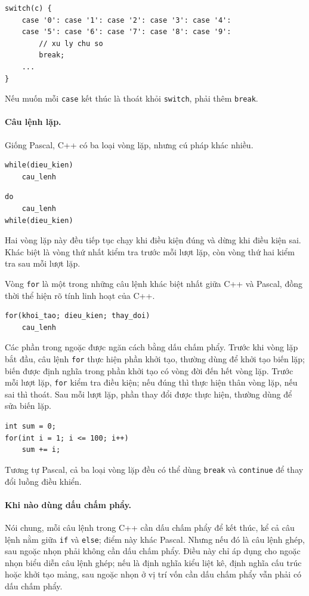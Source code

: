 \documentclass[11pt]{article}
\newcommand{\cpp}{C++}
\newcommand{\pascal}{Pascal}
\begin{document}
\begin{verbatim}
switch(c) {
    case '0': case '1': case '2': case '3': case '4':
    case '5': case '6': case '7': case '8': case '9':
        // xu ly chu so
        break;
    ...
}
\end{verbatim}

Nếu muốn mỗi \verb|case| kết thúc là thoát khỏi \verb|switch|, phải thêm
\verb|break|.

\paragraph{Câu lệnh lặp.}
Giống \pascal{}, \cpp{} có ba loại vòng lặp, nhưng cú pháp khác nhiều.

\begin{verbatim}
while(dieu_kien)
    cau_lenh
\end{verbatim}

\begin{verbatim}
do
    cau_lenh
while(dieu_kien)
\end{verbatim}

Hai vòng lặp này đều tiếp tục chạy khi điều kiện đúng và dừng khi điều kiện
sai. Khác biệt là vòng thứ nhất kiểm tra trước mỗi lượt lặp, còn vòng thứ hai
kiểm tra sau mỗi lượt lặp.

Vòng \verb|for| là một trong những câu lệnh khác biệt nhất giữa \cpp{} và
\pascal{}, đồng thời thể hiện rõ tính linh hoạt của \cpp{}.

\begin{verbatim}
for(khoi_tao; dieu_kien; thay_doi)
    cau_lenh
\end{verbatim}

Các phần trong ngoặc được ngăn cách bằng dấu chấm phẩy. Trước khi vòng lặp
bắt đầu, câu lệnh \verb|for| thực hiện phần khởi tạo, thường dùng để khởi tạo
biến lặp; biến được định nghĩa trong phần khởi tạo có vòng đời đến hết vòng
lặp. Trước mỗi lượt lặp, \verb|for| kiểm tra điều kiện; nếu đúng thì thực
hiện thân vòng lặp, nếu sai thì thoát. Sau mỗi lượt lặp, phần thay đổi được
thực hiện, thường dùng để sửa biến lặp.

\begin{verbatim}
int sum = 0;
for(int i = 1; i <= 100; i++)
    sum += i;
\end{verbatim}

Tương tự \pascal{}, cả ba loại vòng lặp đều có thể dùng \verb|break| và
\verb|continue| để thay đổi luồng điều khiển.

\paragraph{Khi nào dùng dấu chấm phẩy.}
Nói chung, mỗi câu lệnh trong \cpp{} cần dấu chấm phẩy để kết thúc, kể cả câu
lệnh nằm giữa \verb|if| và \verb|else|; điểm này khác \pascal{}. Nhưng nếu đó
là câu lệnh ghép, sau ngoặc nhọn phải không cần dấu chấm phẩy. Điều này chỉ
áp dụng cho ngoặc nhọn biểu diễn câu lệnh ghép; nếu là định nghĩa kiểu liệt
kê, định nghĩa cấu trúc hoặc khởi tạo mảng, sau ngoặc nhọn ở vị trí vốn cần
dấu chấm phẩy vẫn phải có dấu chấm phẩy.
\end{document}
